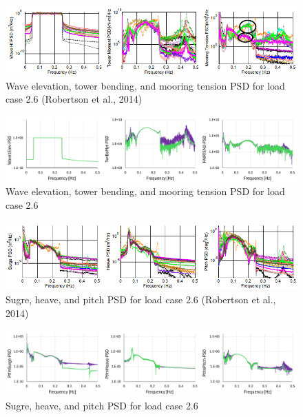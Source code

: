 \documentclass[a4paper, 11pt]{article}
\begin{document}
\begin{figure}[H]
    \centering
    \includegraphics[width=1\textwidth]{w_t_t_p.png}
    \caption{\small Wave elevation, tower bending, and mooring tension PSD for load case 2.6 (Robertson et al., 2014)}
    \label{fig:w_t_t_p}
\end{figure}

\begin{figure}[H]
    \centering
    \includegraphics[width=1\textwidth]{wave_twr_ten_psd.png}
    \caption{\small Wave elevation, tower bending, and mooring tension PSD for load case 2.6}
    \label{fig:w_t_t_p_mine}
\end{figure}

\begin{figure}[H]
    \centering
    \includegraphics[width=1\textwidth]{s_h_p_p.png}
    \caption{\small Sugre, heave, and pitch PSD for load case 2.6 (Robertson et al., 2014)}
    \label{fig:s_h_p_p}
\end{figure}

\begin{figure}[H]
    \centering
    \includegraphics[width=1\textwidth]{sur_hea_pit_psd.png}
    \caption{\small Sugre, heave, and pitch PSD for load case 2.6}
    \label{fig:s_h_p_p_mine}
\end{figure}
\end{document}
